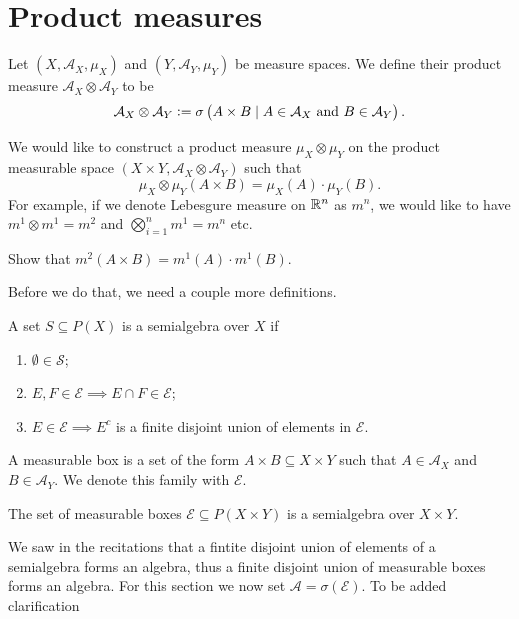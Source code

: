 \documentclass[11pt,a4paper]{article}
\newcommand{\A}{\mathcal A}
\begin{document}
\section{Product measures}
\begin{definition}
  Let $(X,\A_X,\mu_X)$ and $(Y,\A_Y,\mu_Y)$ be measure spaces.
  We define their product measure $\A_X \otimes \A_Y$ to be
  \[
    \A_X \otimes \A_Y :=
    \sigma\del{A \times B \mid A \in \A_X \stand B \in \A_Y}.
  \]
\end{definition}
We would like to construct a product measure $\mu_X \otimes \mu_Y$
on the product measurable space $(X \times Y, \A_X \otimes \A_Y)$
such that
\[
  \mu_X \otimes \mu_Y(A \times B) =
  \mu_X(A) \cdot \mu_Y(B).
\]
For example, if we denote Lebesgure measure on $\mathbb{R}^n$ as $m^n$,
we would like to have $m^1 \otimes m^1 = m^2$ and
$\bigotimes_{i=1}^{n} m^1 = m^n$ etc.
\begin{exercise}
  Show that $m^2(A \times B) = m^1(A) \cdot m^1(B)$.
\end{exercise}

Before we do that, we need a couple more definitions.

\begin{definition}[Semialgebra]
  A set $S \subseteq P(X)$ is a semialgebra over $X$ if
  \begin{enumerate}
    \item[(1)] $\emptyset \in \mathcal S$;
    \item[(2)] $E,F \in \mathcal E \implies E \cap F \in \mathcal E$;
    \item[(3)] $E \in \mathcal E \implies E^c$ is a finite disjoint
      union of elements in $\mathcal E$.
  \end{enumerate}
\end{definition}

\begin{definition}
  A measurable box is a set of the form $A \times B \subseteq X \times Y$
  such that $A \in \A_X$ and $B \in \A_Y$.
  We denote this family with $\mathcal E$.
\end{definition}
\begin{remark}
  The set of measurable boxes $\mathcal E \subseteq P(X \times Y)$ is
  a semialgebra over $X \times Y$.
\end{remark}

We saw in the recitations that a fintite disjoint union of elements
of a semialgebra forms an algebra, thus a finite disjoint union
of measurable boxes forms an algebra. 
For this section we now set $\A = \sigma(\mathcal E)$.
To be added clarification
\end{document}
